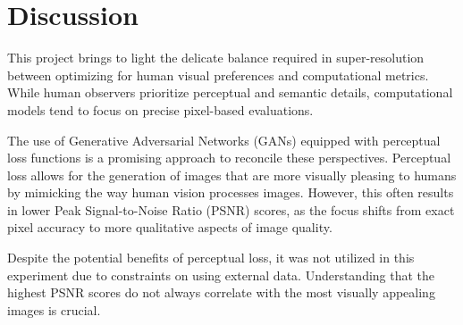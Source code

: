 \section{Discussion}
\label{sec:Discussion} %

This project brings to light the delicate balance required in super-resolution between optimizing for human visual preferences and computational metrics. While human observers prioritize perceptual and semantic details, computational models tend to focus on precise pixel-based evaluations.

The use of Generative Adversarial Networks (GANs) equipped with perceptual loss functions is a promising approach to reconcile these perspectives. Perceptual loss allows for the generation of images that are more visually pleasing to humans by mimicking the way human vision processes images. However, this often results in lower Peak Signal-to-Noise Ratio (PSNR) scores, as the focus shifts from exact pixel accuracy to more qualitative aspects of image quality.

Despite the potential benefits of perceptual loss, it was not utilized in this experiment due to constraints on using external data. Understanding that the highest PSNR scores do not always correlate with the most visually appealing images is crucial. 
